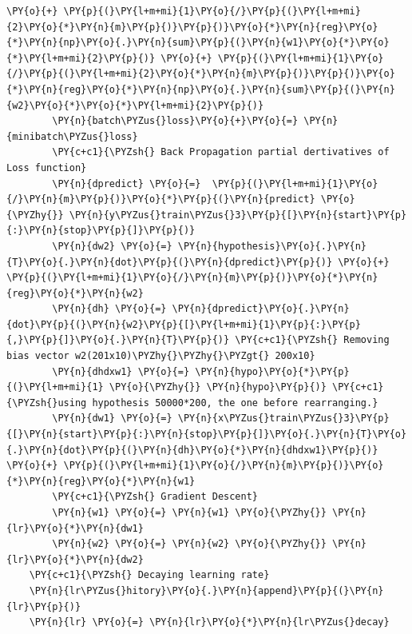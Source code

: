 \documentclass[a4paper,11pt]{article}%
\begin{document}
\begin{tcolorbox}[breakable, size=fbox, boxrule=1pt, pad at break*=1mm,colback=cellbackground, colframe=cellborder]
\begin{Verbatim}[commandchars=\\\{\}]
             \PY{o}{+} \PY{p}{(}\PY{l+m+mi}{1}\PY{o}{/}\PY{p}{(}\PY{l+m+mi}{2}\PY{o}{*}\PY{n}{m}\PY{p}{)}\PY{p}{)}\PY{o}{*}\PY{n}{reg}\PY{o}{*}\PY{n}{np}\PY{o}{.}\PY{n}{sum}\PY{p}{(}\PY{n}{w1}\PY{o}{*}\PY{o}{*}\PY{l+m+mi}{2}\PY{p}{)} \PY{o}{+} \PY{p}{(}\PY{l+m+mi}{1}\PY{o}{/}\PY{p}{(}\PY{l+m+mi}{2}\PY{o}{*}\PY{n}{m}\PY{p}{)}\PY{p}{)}\PY{o}{*}\PY{n}{reg}\PY{o}{*}\PY{n}{np}\PY{o}{.}\PY{n}{sum}\PY{p}{(}\PY{n}{w2}\PY{o}{*}\PY{o}{*}\PY{l+m+mi}{2}\PY{p}{)}
        \PY{n}{batch\PYZus{}loss}\PY{o}{+}\PY{o}{=} \PY{n}{minibatch\PYZus{}loss}
        \PY{c+c1}{\PYZsh{} Back Propagation partial dertivatives of Loss function}
        \PY{n}{dpredict} \PY{o}{=}  \PY{p}{(}\PY{l+m+mi}{1}\PY{o}{/}\PY{n}{m}\PY{p}{)}\PY{o}{*}\PY{p}{(}\PY{n}{predict} \PY{o}{\PYZhy{}} \PY{n}{y\PYZus{}train\PYZus{}3}\PY{p}{[}\PY{n}{start}\PY{p}{:}\PY{n}{stop}\PY{p}{]}\PY{p}{)}
        \PY{n}{dw2} \PY{o}{=} \PY{n}{hypothesis}\PY{o}{.}\PY{n}{T}\PY{o}{.}\PY{n}{dot}\PY{p}{(}\PY{n}{dpredict}\PY{p}{)} \PY{o}{+} \PY{p}{(}\PY{l+m+mi}{1}\PY{o}{/}\PY{n}{m}\PY{p}{)}\PY{o}{*}\PY{n}{reg}\PY{o}{*}\PY{n}{w2}
        \PY{n}{dh} \PY{o}{=} \PY{n}{dpredict}\PY{o}{.}\PY{n}{dot}\PY{p}{(}\PY{n}{w2}\PY{p}{[}\PY{l+m+mi}{1}\PY{p}{:}\PY{p}{,}\PY{p}{]}\PY{o}{.}\PY{n}{T}\PY{p}{)} \PY{c+c1}{\PYZsh{} Removing bias vector w2(201x10)\PYZhy{}\PYZhy{}\PYZgt{} 200x10}
        \PY{n}{dhdxw1} \PY{o}{=} \PY{n}{hypo}\PY{o}{*}\PY{p}{(}\PY{l+m+mi}{1} \PY{o}{\PYZhy{}} \PY{n}{hypo}\PY{p}{)} \PY{c+c1}{\PYZsh{}using hypothesis 50000*200, the one before rearranging.}
        \PY{n}{dw1} \PY{o}{=} \PY{n}{x\PYZus{}train\PYZus{}3}\PY{p}{[}\PY{n}{start}\PY{p}{:}\PY{n}{stop}\PY{p}{]}\PY{o}{.}\PY{n}{T}\PY{o}{.}\PY{n}{dot}\PY{p}{(}\PY{n}{dh}\PY{o}{*}\PY{n}{dhdxw1}\PY{p}{)} \PY{o}{+} \PY{p}{(}\PY{l+m+mi}{1}\PY{o}{/}\PY{n}{m}\PY{p}{)}\PY{o}{*}\PY{n}{reg}\PY{o}{*}\PY{n}{w1}
        \PY{c+c1}{\PYZsh{} Gradient Descent}
        \PY{n}{w1} \PY{o}{=} \PY{n}{w1} \PY{o}{\PYZhy{}} \PY{n}{lr}\PY{o}{*}\PY{n}{dw1}
        \PY{n}{w2} \PY{o}{=} \PY{n}{w2} \PY{o}{\PYZhy{}} \PY{n}{lr}\PY{o}{*}\PY{n}{dw2}    
    \PY{c+c1}{\PYZsh{} Decaying learning rate}
    \PY{n}{lr\PYZus{}hitory}\PY{o}{.}\PY{n}{append}\PY{p}{(}\PY{n}{lr}\PY{p}{)}
    \PY{n}{lr} \PY{o}{=} \PY{n}{lr}\PY{o}{*}\PY{n}{lr\PYZus{}decay}
\end{Verbatim}
\end{tcolorbox}
\end{document}

